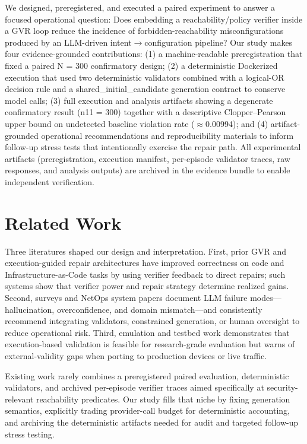 \documentclass[conference]{IEEEtran}
\begin{document}
We designed, preregistered, and executed a paired experiment to answer a focused operational question: Does embedding a reachability/policy verifier inside a GVR loop reduce the incidence of forbidden-reachability misconfigurations produced by an LLM-driven intent\ensuremath{\rightarrow}configuration pipeline? Our study makes four evidence-grounded contributions: (1) a machine-readable preregistration that fixed a paired N = 300 confirmatory design; (2) a deterministic Dockerized execution that used two deterministic validators combined with a logical-OR decision rule and a shared\_initial\_candidate generation contract to conserve model calls; (3) full execution and analysis artifacts showing a degenerate confirmatory result (n11 = 300) together with a descriptive Clopper--Pearson upper bound on undetected baseline violation rate (\ensuremath{\approx}0.00994); and (4) artifact-grounded operational recommendations and reproducibility materials to inform follow-up stress tests that intentionally exercise the repair path. All experimental artifacts (preregistration, execution manifest, per-episode validator traces, raw responses, and analysis outputs) are archived in the evidence bundle to enable independent verification.

\section{Related Work}
Three literatures shaped our design and interpretation. First, prior GVR and execution-guided repair architectures have improved correctness on code and Infrastructure-as-Code tasks by using verifier feedback to direct repairs; such systems show that verifier power and repair strategy determine realized gains. Second, surveys and NetOps system papers document LLM failure modes---hallucination, overconfidence, and domain mismatch---and consistently recommend integrating validators, constrained generation, or human oversight to reduce operational risk. Third, emulation and testbed work demonstrates that execution-based validation is feasible for research-grade evaluation but warns of external-validity gaps when porting to production devices or live traffic.

Existing work rarely combines a preregistered paired evaluation, deterministic validators, and archived per-episode verifier traces aimed specifically at security-relevant reachability predicates. Our study fills that niche by fixing generation semantics, explicitly trading provider-call budget for deterministic accounting, and archiving the deterministic artifacts needed for audit and targeted follow-up stress testing.
\end{document}
